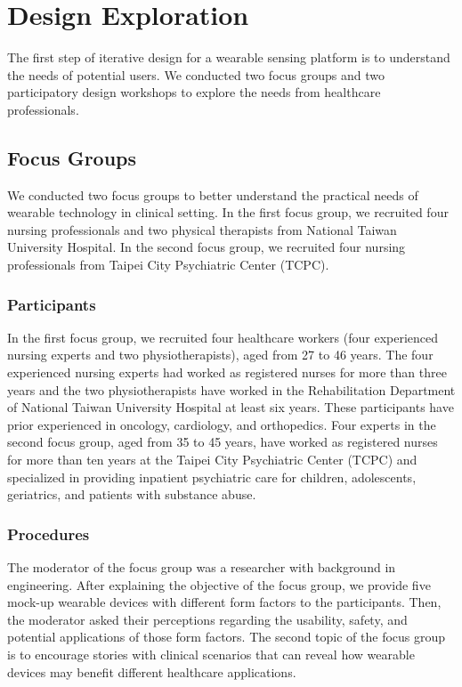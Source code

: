 \section{Design Exploration}

The first step of iterative design for a wearable sensing platform is to understand the needs of potential users. We conducted two focus groups and two participatory design workshops to explore the needs from healthcare professionals.

\subsection{Focus Groups}
We conducted two focus groups to better understand the practical needs of wearable technology in clinical setting. In the first focus group, we recruited four nursing professionals and two physical therapists from National Taiwan University Hospital. In the second focus group, we recruited four nursing professionals from Taipei City Psychiatric Center (TCPC).

\subsubsection{Participants}
In the first focus group, we recruited four healthcare workers (four experienced nursing experts and two physiotherapists), aged from 27 to 46 years. The four experienced nursing experts had worked as registered nurses for more than three years and the two physiotherapists have worked in the Rehabilitation Department of National Taiwan University Hospital at least six years. These participants have prior experienced in oncology, cardiology, and orthopedics. Four experts in the second focus group, aged from 35 to 45 years, have worked as registered nurses for more than ten years at the Taipei City Psychiatric Center (TCPC) and specialized in providing inpatient psychiatric care for children, adolescents, geriatrics, and patients with substance abuse.

\subsubsection{Procedures}
The moderator of the focus group was a researcher with background in engineering. After explaining the objective of the focus group, we provide five mock-up wearable devices with different form factors to the participants. Then, the moderator asked their perceptions regarding the usability, safety, and potential applications of those form factors. The second topic of the focus group is to encourage stories with clinical scenarios that can reveal how wearable devices may benefit different healthcare applications.

